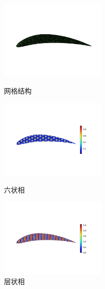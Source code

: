 \documentclass[12pt]{article}
\begin{document}
\begin{CJK}{UTF8}{gkai}
\begin{figure}[H]
	\setlength{\abovecaptionskip}{0.cm}
	\setlength{\belowcaptionskip}{-0.cm}
	\begin{minipage}[!htbp]{0.3\linewidth}
		\includegraphics[width=5.2cm]{Figure_air.png}
		\caption*{网格结构}
	\end{minipage}
	\hspace{0.23in}
	\begin{minipage}[!htbp]{0.3\linewidth}
		\includegraphics[width=5.2cm]{scftfigure484.png}
		\caption*{六状相}
	\end{minipage}
	\hspace{0.23in}
	\begin{minipage}[!htbp]{0.3\linewidth}
		\includegraphics[width=5.2cm]{scftfigure1502.png}
		\caption*{层状相}
	\end{minipage}
\end{figure}    
    
\end{CJK}
\end{document}
